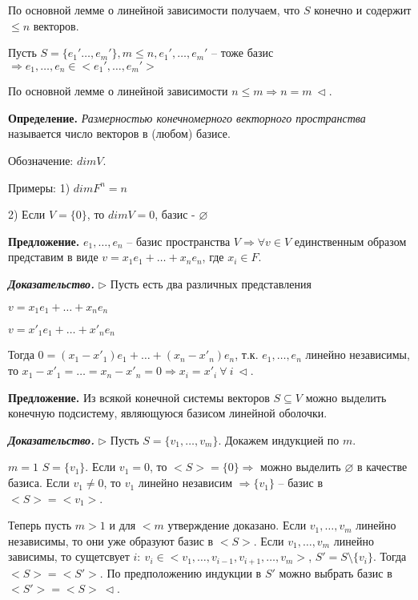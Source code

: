 \vspace{\baselineskip}
По основной лемме о линейной зависимости получаем, что $S$ конечно и содержит $\leq n$ векторов.

Пусть $S = \{e_1' \dots, e_m'\}, m \leq n, e_1', \dots, e_m'$ -- тоже базис $\Rightarrow e_1, \dots, e_n \in <e_1', \dots, e_m'>$

По основной лемме о линейной зависимости $n \leq m \Rightarrow n = m \ \lhd$.

\vspace{\baselineskip}
\textbf{Определение.} \textit{Размерностью конечномерного векторного пространства} называется число векторов в (любом) базисе.

Обозначение: $dim V$.

Примеры: 1) $dim F^n = n$

2) Если $V = \{0\}$, то $dimV = 0$, базис - $\varnothing$

\vspace{\baselineskip}
\textbf{Предложение.} $e_1, \dots, e_n$ -- базис пространства $V \Rightarrow \forall v \in V$ единственным образом представим в виде $v = x_1 e_1 + \dots + x_n e_n$, где $x_i \in F$.

\vspace{\baselineskip}
\textbf{\textit{Доказательство.}} $\rhd$ Пусть есть два различных представления

$v = x_1 e_1 + \dots + x_n e_n$

$v = x'_1 e_1 + \dots + x'_n e_n$

Тогда $0 = (x_1 - x'_1) e_1 + \dots + (x_n - x'_n) e_n$, т.к. $e_1, \dots, e_n$ линейно независимы, то $x_1 - x'_1 = \dots = x_n - x'_n = 0 \Rightarrow x_i = x'_i \ \forall \ i \ \lhd$.

\vspace{\baselineskip}
\textbf{Предложение.} Из всякой конечной системы векторов $S \subseteq V$ можно выделить конечную подсистему, являющуюся базисом линейной оболочки.

\vspace{\baselineskip}
\textbf{\textit{Доказательство.}} $\rhd$ Пусть $S = \{v_1, \dots, v_m\}$. Докажем индукцией по $m$.

$m = 1$ $S = \{v_1\}$. Если $v_1 = 0$, то $<S> = \{0\} \Rightarrow$ можно выделить $\varnothing$ в качестве базиса. Если $v_1 \neq 0$, то $v_1$ линейно независим $\Rightarrow \{v_1\}$ -- базис в $<S> = <v_1>$.

Теперь пусть $m > 1$ и для $<m$ утверждение доказано. Если $v_1, \dots, v_m$ линейно независимы, то они уже образуют базис в $<S>$. Если $v_1, \dots, v_m$ линейно зависимы, то сущетсвует $i: \ v_i \in <v_1, \dots, v_{i-1}, v_{i+1}, \dots, v_m>$, $S' = S \setminus \{v_i\}$. Тогда $<S> = <S'>$. По предположению индукции в $S'$  можно выбрать базис в $<S'> = <S> \ \lhd$.

